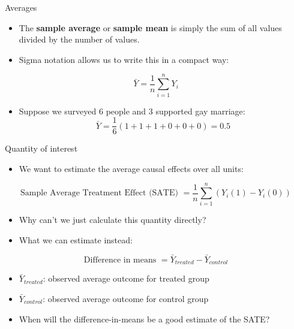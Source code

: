 \documentclass[
  ignorenonframetext,
]{beamer}
\providecommand{\tightlist}{%
  \setlength{\itemsep}{0pt}\setlength{\parskip}{0pt}}
\begin{document}
\begin{frame}{Averages}
\label{averages}
\begin{itemize}
\item
  The \textbf{sample average} or \textbf{sample mean} is simply the sum
  of all values divided by the number of values. \pause
\item
  Sigma notation allows us to write this in a compact way: \pause
\end{itemize}

\[
  \bar{Y} = \frac{1}{n} \sum_{i=1}^n Y_i
  \]

\begin{itemize}
\tightlist
\item
  Suppose we surveyed 6 people and 3 supported gay marriage: \pause \[
    \bar{Y} = \frac{1}{6} (1 + 1 + 1 + 0 + 0 + 0) = 0.5
    \]
\end{itemize}
\end{frame}

\begin{frame}{Quantity of interest}
\label{quantity-of-interest}
\begin{itemize}
\tightlist
\item
  We want to estimate the average causal effects over all units:
  \vspace{-5pt} \pause
\end{itemize}

\[
  \text{Sample Average Treatment Effect (SATE) } = \frac{1}{n} \sum_{i=1}^n \left( Y_i(1) - Y_i(0) \right)
  \]

\begin{itemize}
\tightlist
\item
  Why can't we just calculate this quantity directly? \pause
\item
  What we can estimate instead: \vspace{-5pt} \pause
\end{itemize}

\[
  \text{Difference in means } = \bar{Y}_{treated} - \bar{Y}_{control}
  \]

\begin{itemize}
\tightlist
\item
  \(\bar{Y}_{treated}\): observed average outcome for treated group
\item
  \(\bar{Y}_{control}\): observed average outcome for control group
  \pause
\item
  When will the difference-in-means be a good estimate of the SATE?
\end{itemize}
\end{frame}
\end{document}
